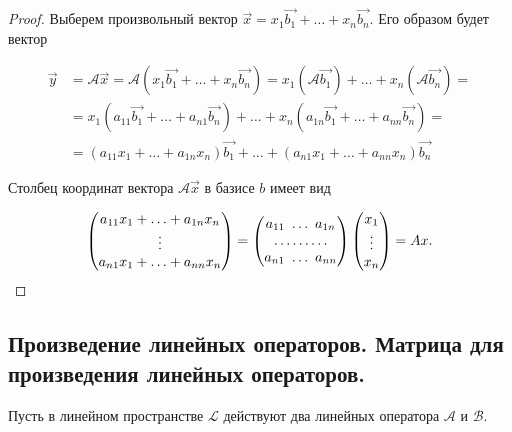 \begin{proof}
    Выберем произвольный вектор $\vec{x} = x_1\vec{b_1} + \ldots + x_n\vec{b_n}$. Его образом будет вектор

    \begin{align*}
        \vec{y} &= \mathscr{A}\vec{x} =  \mathscr{A}(x_1\vec{b_1} + \ldots + x_n\vec{b_n}) = x_1(\mathscr{A}\vec{b_1}) + \ldots + x_n(\mathscr{A}\vec{b_n}) = \\
        &= x_1(a_{11}\vec{b_1} + \ldots + a_{n1}\vec{b_n}) + \ldots + x_n(a_{1n}\vec{b_1} + \ldots + a_{nn}\vec{b_n}) = \\
        &= (a_{11}x_1 + \ldots + a_{1n}x_n)\vec{b_1} + \ldots + (a_{n1}x_1 + \ldots + a_{nn}x_n)\vec{b_n}
    \end{align*}

    Столбец координат вектора $\mathscr{A}\vec{x}$ в базисе $b$ имеет вид

    \begin{equation*}
        \begin{pmatrix} 
            a_{11}x_1 + \ldots + a_{1n}x_n \\
            \vdots \\
            a_{n1}x_1 + \ldots + a_{nn}x_n
        \end{pmatrix} =
        \begin{pmatrix} 
            a_{11} \thinspace \thinspace \ldots \thinspace \thinspace a_{1n} \\
            \ldots \ldots \ldots \\
            a_{n1} \thinspace \thinspace \ldots \thinspace \thinspace a_{nn}
        \end{pmatrix}
        \begin{pmatrix} 
            x_1 \\
            \vdots \\
            x_n
        \end{pmatrix} = Ax
    .\end{equation*}
\end{proof}


\newpage


\subsection{
    Произведение линейных операторов. Матрица для произведения 
    линейных операторов.
}

Пусть в линейном пространстве $\mathcal{L}$ действуют два линейных оператора $\mathscr{A}$ и $\mathscr{B}$. 

